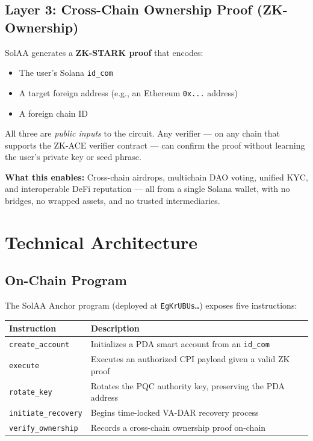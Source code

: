 \documentclass[11pt, a4paper]{article}
\begin{document}
\subsection{Layer 3: Cross-Chain Ownership Proof (ZK-Ownership)}

SolAA generates a \textbf{ZK-STARK proof} that encodes:

\begin{itemize}
  \item The user's Solana \texttt{id\_com}
  \item A target foreign address (e.g., an Ethereum \texttt{0x...} address)
  \item A foreign chain ID
\end{itemize}

All three are \textit{public inputs} to the circuit. Any verifier --- on any chain that
supports the ZK-ACE verifier contract --- can confirm the proof without learning the
user's private key or seed phrase.

\begin{calloutbox}
  \textbf{What this enables:} Cross-chain airdrops, multichain DAO voting, unified KYC,
  and interoperable DeFi reputation --- all from a single Solana wallet, with no bridges,
  no wrapped assets, and no trusted intermediaries.
\end{calloutbox}

\section{Technical Architecture}

\subsection{On-Chain Program}

The SolAA Anchor program (deployed at \texttt{EgKrUBUs\ldots}) exposes five instructions:

\begin{center}
\begin{tabular}{lp{9cm}}
  \toprule
  \textbf{Instruction} & \textbf{Description} \\
  \midrule
  \texttt{create\_account} & Initializes a PDA smart account from an \texttt{id\_com} \\
  \texttt{execute} & Executes an authorized CPI payload given a valid ZK proof \\
  \texttt{rotate\_key} & Rotates the PQC authority key, preserving the PDA address \\
  \texttt{initiate\_recovery} & Begins time-locked VA-DAR recovery process \\
  \texttt{verify\_ownership} & Records a cross-chain ownership proof on-chain \\
  \bottomrule
\end{tabular}
\end{center}
\end{document}
